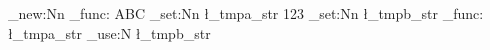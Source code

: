 \documentclass{article}
\begin{document}
\ExplSyntaxOn
\cs_new:Nn \my_func: { ABC }
\str_set:Nn \l_tmpa_str { 123 }
\str_set:Nn \l_tmpb_str { \my_func: \l_tmpa_str }
\str_use:N \l_tmpb_str
\ExplSyntaxOff
\end{document}
